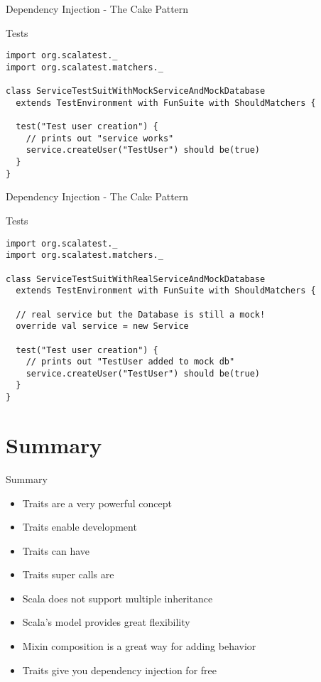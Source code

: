 \begin{frame}[fragile]{Dependency Injection - The Cake Pattern}
\begin{exampleblock}{Tests}
\begin{lstlisting}
import org.scalatest._
import org.scalatest.matchers._

class ServiceTestSuitWithMockServiceAndMockDatabase
  extends TestEnvironment with FunSuite with ShouldMatchers {

  test("Test user creation") {
    // prints out "service works"
    service.createUser("TestUser") should be(true)
  }
}
\end{lstlisting}
\end{exampleblock}
\end{frame}

\begin{frame}[fragile]{Dependency Injection - The Cake Pattern}
\begin{exampleblock}{Tests}
\begin{lstlisting}
import org.scalatest._
import org.scalatest.matchers._

class ServiceTestSuitWithRealServiceAndMockDatabase
  extends TestEnvironment with FunSuite with ShouldMatchers {

  // real service but the Database is still a mock!
  override val service = new Service
  
  test("Test user creation") {
    // prints out "TestUser added to mock db"
    service.createUser("TestUser") should be(true)
  }
}
\end{lstlisting}
\end{exampleblock}
\end{frame}

\section{Summary}
\begin{frame}{Summary}
\begin{itemize}
  \item Traits are a very powerful concept
  \item Traits enable  development
  \item Traits can have 
  \item Traits super calls are 
  \item Scala does not support multiple inheritance
  \item Scala's  model provides great flexibility
  \item Mixin composition is a great way for adding behavior
  \item Traits give you dependency injection for free
\end{itemize}
\end{frame}